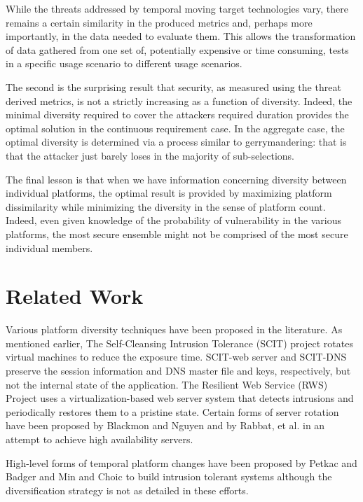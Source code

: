 \documentclass{acm_proc_article-sp}
\begin{document}
While the threats addressed by temporal moving target technologies vary, there remains a certain similarity in the
produced metrics and, perhaps more importantly, in the data needed to evaluate them.  This allows the transformation of
data gathered from one set of, potentially expensive or time consuming, tests in a specific usage scenario to different
usage scenarios.

The second is the surprising result that security, as measured using the threat derived metrics, is not a strictly
increasing as a function of diversity.  Indeed, the minimal diversity required to cover the attackers required duration
provides the optimal solution in the continuous requirement case.  In the aggregate case, the optimal diversity is
determined via a process similar to gerrymandering: that is that the attacker just barely loses in the majority of
sub-selections.

The final lesson is that when we have information concerning diversity between individual platforms, the optimal result
is provided by maximizing platform dissimilarity while minimizing the diversity in the sense of platform count.  Indeed,
even given knowledge of the probability of vulnerability in the various platforms, the most secure ensemble might not be
comprised of the most secure individual members.



\section{Related Work}
\label{RW}

Various platform diversity techniques have been proposed in the literature. As mentioned earlier, The Self-Cleansing Intrusion Tolerance (SCIT) project rotates virtual machines to reduce the exposure time. SCIT-web server \cite{scit-web} and SCIT-DNS \cite{scit-dns} preserve the session information and DNS master file and keys, respectively, but not the internal state of the application. The Resilient Web Service (RWS) Project \cite{rws} uses a virtualization-based web server system that detects intrusions and periodically restores them to a
pristine state. Certain forms of server rotation have been proposed by Blackmon and Nguyen \cite{hafs} and by Rabbat, et al. \cite{cluster} in an attempt to achieve high availability servers. 

High-level forms of temporal platform changes have been proposed by Petkac and Badger \cite{it1} and Min and Choic \cite{it2} to build intrusion tolerant systems although the diversification strategy is not as detailed in these efforts.
\end{document}
